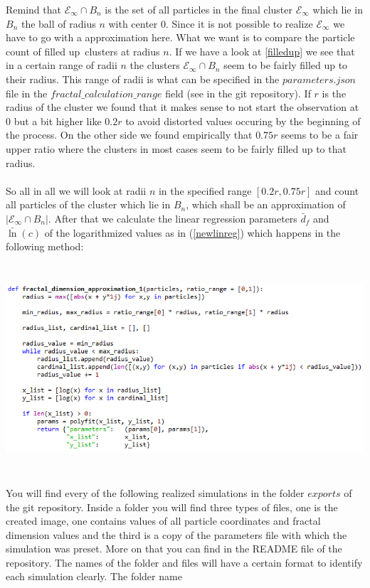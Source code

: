 \documentclass[12pt,a4paper]{scrartcl}
\numberwithin{equation}{subsection}
\newcommand{\E}{\mathcal{E}} %
\newcommand{\1}{\mathbbm{1}}
\numberwithin{equation}{section}
\theoremstyle{definition}
\begin{document}
Remind that $\E_\infty \cap B_n$ is the set of all particles in the final cluster $\E_\infty$ which lie in $B_n$ the ball of radius $n$ with center $0$. Since it is not possible to realize $\E_\infty$ we have to go with a approximation here. What we want is to compare the particle count of \glqq filled up\grqq\ clusters at radius $n$. If we have a look at \autoref{filledup} we see that in a certain range of radii $n$ the clusters $\E_\infty \cap B_n$ seem to be fairly filled up to their radius. This range of radii is what can be specified in the $\mathit{parameters.json}$ file in the $\mathit{fractal\_calculation\_range}$ field (see in the git repository). If $r$ is the radius of the cluster we found that it makes sense to not start the observation at $0$ but a bit higher like $0.2r$ to avoid distorted values occuring by the beginning of the process. On the other side we found empirically that $0.75r$ seems to be a fair upper ratio where the clusters in most cases seem to be fairly filled up to that radius. \\
\\So all in all we will look at radii $n$ in the specified range $[0.2r, 0.75r]$ and count all particles of the cluster which lie in $B_n$, which shall be an approximation of $|\E_\infty \cap B_n|$. After that we calculate the linear regression parameters $\bar d_f$ and $\bar \ln(c)$ of the logarithmized values as in (\ref{newlinreg}) which happens in the following method:\\
\\
\includegraphics[height=7.5cm]{images/code-snippets/fractalnew.png} \\
\\
You will find every of the following realized simulations in the folder $\mathit{exports}$ of the git repository. Inside a folder you will find three types of files, one is the created image, one contains values of all particle coordinates and fractal dimension values and the third is a copy of the parameters file with which the simulation was preset. More on that you can find in the README file of the repository. The names of the folder and files will have a certain format to identify each simulation clearly. The folder name
\end{document}
